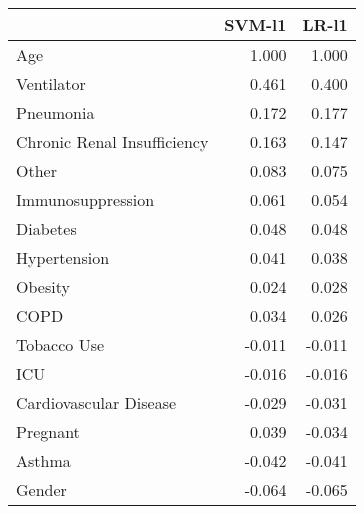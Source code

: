 \begin{tabular}{lrr}
\toprule
{} &  SVM-l1 &  LR-l1 \\
\midrule
Age                         &   1.000 &  1.000 \\
Ventilator                  &   0.461 &  0.400 \\
Pneumonia                   &   0.172 &  0.177 \\
Chronic Renal Insufficiency &   0.163 &  0.147 \\
Other                       &   0.083 &  0.075 \\
Immunosuppression           &   0.061 &  0.054 \\
Diabetes                    &   0.048 &  0.048 \\
Hypertension                &   0.041 &  0.038 \\
Obesity                     &   0.024 &  0.028 \\
COPD                        &   0.034 &  0.026 \\
Tobacco Use                 &  -0.011 & -0.011 \\
ICU                         &  -0.016 & -0.016 \\
Cardiovascular Disease      &  -0.029 & -0.031 \\
Pregnant                    &   0.039 & -0.034 \\
Asthma                      &  -0.042 & -0.041 \\
Gender                      &  -0.064 & -0.065 \\
\bottomrule
\end{tabular}
